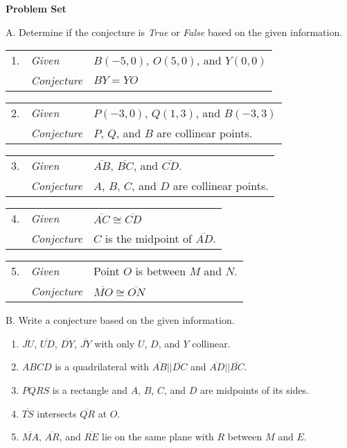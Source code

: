 \textbf{Problem Set}

\vspce

A. Determine if the conjecture is \emph{True} or \emph{False} based on the given information. 
\vspce 

\begin{tabular}{rN{5em}M{20em}}
1. & \textit{Given} & $B(-5,0)$, $O(5,0)$, and $Y(0,0)$ \\
& \textit{Conjecture} & $BY=YO$ \\
\end{tabular} 

\begin{tabular}{rN{5em}M{20em}}
2. & \textit{Given} & $P(-3,0)$, $Q(1,3)$, and $B(-3,3)$ \\
& \textit{Conjecture} & $P$, $Q$, and $B$ are collinear points.\\
\end{tabular} 

\begin{tabular}{rN{5em}M{20em}}
3. & \textit{Given} & $\overline{AB} $, $\overline{BC}$, and $\overline{CD}$. \\
& \textit{Conjecture} & $A$, $B$, $C$, and $D$ are collinear points. \\
\end{tabular} 
  
\begin{tabular}{rN{5em}M{20em}}
4. & \textit{Given} & $\overline{AC} \cong \overline{CD} $\\
& \textit{Conjecture} & $C$ is the midpoint of $\overline{AD} $. \\
\end{tabular} 

\begin{tabular}{rN{5em}M{20em}}
5. & \textit{Given} & Point $O$ is between $M$ and $N$.  \\
& \textit{Conjecture} & $\overline{MO} \cong \overline{ON} $ \\
\end{tabular} 

\vspace*{1ex}
B. Write a conjecture based on the given information. 
\begin{enumerate}[label = \arabic*. ]
\item $\overline{JU}$, $\overline{UD}$, $\overline{DY}$, $\overline{JY}$ with only $U$, $D$, and $Y$ collinear. 
\item $ABCD$ is a quadrilateral with $\overline{AB}||\overline{DC}$ and $\overline{AD}||\overline{BC}$. 
\item $PQRS$ is a rectangle  and $A$, $B$, $C$, and $D$ are midpoints of its sides. 
\item $\overline{TS}$ intersects $\overline{QR}$ at $O$.
\item $\overline{MA}$, $\overline{AR}$, and $\overline{RE}$ lie on the same plane with $R$ between $M$ and $E$. 
\end{enumerate} 
